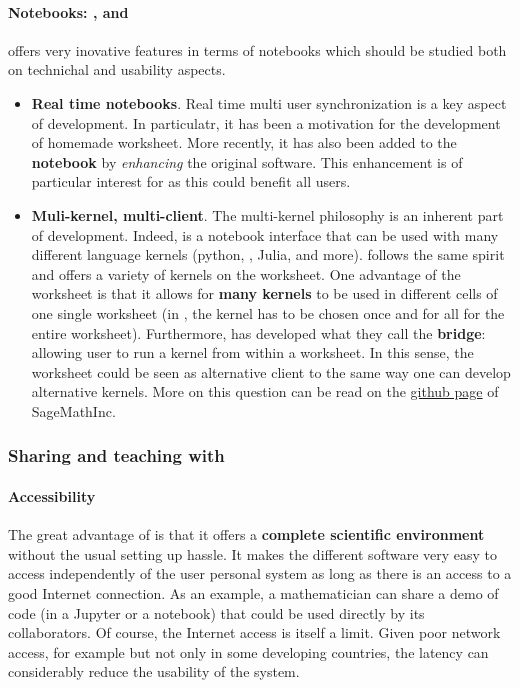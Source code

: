 \documentclass{deliverablereport}
\begin{document}
\paragraph{Notebooks: \SMC, \Sage and \Jupyter}

\SMC offers very inovative features in terms of notebooks which should be studied
both on technichal and usability aspects.

\begin{itemize}
\item \textbf{Real time notebooks}. Real time multi user synchronization 
is a key aspect of \SMC development. In particulatr, it has been a motivation 
for the development of \SMC homemade \Sage worksheet. More recently, it has
also been added to the \textbf{\Jupyter notebook} by \emph{enhancing} the original
software. This enhancement is of particular interest for \ODK as this could
benefit all \Jupyter users.
\item \textbf{Muli-kernel, multi-client}. The multi-kernel philosophy is an inherent part
of \Jupyter development. Indeed, \Jupyter is a notebook interface that can be used
with many different language kernels (python, \Sage, Julia, and more). \SMC
follows the same spirit and offers a variety of kernels on the \Sage worksheet. One advantage
of the \Sage worksheet is that it allows for \textbf{many kernels} to be used in different
cells of one single worksheet (in \Jupyter, the kernel has to be chosen once and for all 
for the entire worksheet). Furthermore, \SMC has developed what they call the \textbf{\Jupyter
bridge}: allowing user to run a \Jupyter kernel from within a \Sage worksheet. In this
sense, the \Sage worksheet could be seen as alternative client to \Jupyter the same way one
can develop alternative kernels. More on this question can be read on the \href{https://github.com/sagemathinc/smc/wiki/sagejupyter}{github
page} of SageMathInc.
\end{itemize}

\subsubsection{Sharing and teaching with \SMC}

\paragraph{Accessibility}

The great advantage of \SMC is that it offers a \textbf{complete
  scientific environment} without the usual setting up hassle. It
makes the different software very easy to access independently of the
user personal system as long as there is an access to a good Internet
connection. As an example, a mathematician can share a demo of code (in
a Jupyter or a \Sage notebook) that could be used directly by its
collaborators. Of course, the Internet access is itself a limit.
Given poor network access, for example but not only in some developing
countries, the latency can considerably reduce the usability of the
system.
\end{document}
